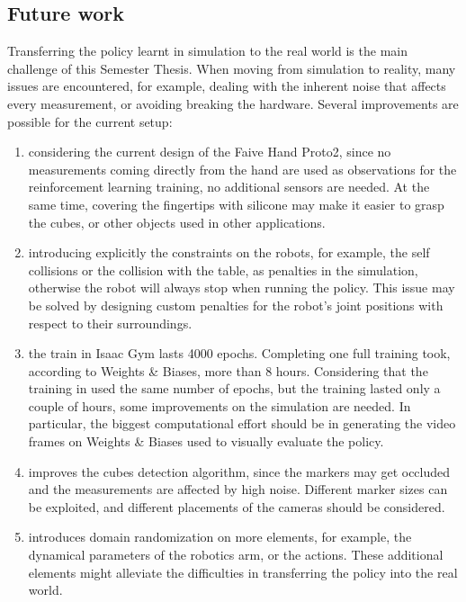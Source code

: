 \documentclass[a4paper]{article}
\begin{document}
\subsection{Future work}
Transferring the policy learnt in simulation to the real world is the main challenge of this Semester Thesis. When moving from simulation to reality, many issues are encountered, for example, dealing with the inherent noise that affects every measurement, or avoiding breaking the hardware.
Several improvements are possible for the current setup:
\begin{enumerate}
    \item considering the current design of the Faive Hand Proto2, since no measurements coming directly from the hand are used as observations for the reinforcement learning training, no additional sensors are needed. At the same time, covering the fingertips with silicone may make it easier to grasp the cubes, or other objects used in other applications.
    \item introducing explicitly the constraints on the robots, for example, the self collisions or the collision with the table, as penalties in the simulation, otherwise the robot will always stop when running the policy. This issue may be solved by designing custom penalties for the robot's joint positions with respect to their surroundings.
    \item the train in Isaac Gym lasts 4000 epochs. Completing one full training took, according to Weights \& Biases, more than 8 hours. Considering that the training in \cite{toshimitsu2023getting} used the same number of epochs, but the training lasted only a couple of hours, some improvements on the simulation are needed. In particular, the biggest computational effort should be in generating the video frames on Weights \& Biases used to visually evaluate the policy.
    \item improves the cubes detection algorithm, since the markers may get occluded and the measurements are affected by high noise. Different marker sizes can be exploited, and different placements of the cameras should be considered.
    \item introduces domain randomization on more elements, for example, the dynamical parameters of the robotics arm, or the actions. These additional elements might alleviate the difficulties in transferring the policy into the real world.
    
\end{enumerate}

\newpage

\printbibliography

\end{document}
